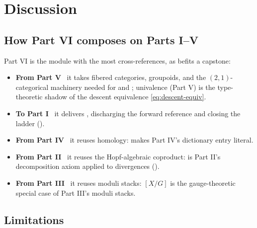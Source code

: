 \documentclass[12pt]{article}
\theoremstyle{definition}
\theoremstyle{remark}
\newcommand{\quot}[2]{[#1/#2]}
\begin{document}
\FloatBarrier

\section{Discussion}
\label{sec:discussion}

\subsection{How Part VI composes on Parts I--V}

Part VI is the module with the most cross-references, as befits a capstone:
\begin{itemize}
\item \textbf{From Part V}~\cite{ML-partV} it takes fibered categories, groupoids, and the
$(2,1)$-categorical machinery needed for  and
; univalence (Part V) is the type-theoretic shadow of the
descent equivalence \eqref{eq:descent-equiv}.
\item \textbf{To Part I}~\cite{ML-partI} it delivers , discharging
the forward reference and closing the ladder ().
\item \textbf{From Part IV}~\cite{ML-partIV} it reuses homology: 
makes Part IV's dictionary entry literal.
\item \textbf{From Part II}~\cite{ML-partII} it reuses the Hopf-algebraic coproduct:
 is Part II's decomposition axiom applied to divergences
().
\item \textbf{From Part III}~\cite{ML-partIII} it reuses moduli stacks: $\quot{X}{G}$ is
the gauge-theoretic special case of Part III's moduli stacks.
\end{itemize}

\subsection{Limitations}
\end{document}
